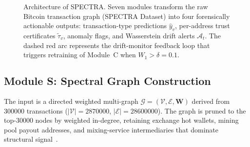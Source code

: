 \documentclass[journal]{IEEEtran}
\begin{document}
\begin{figure}[!t]
\caption{Architecture of \textsc{SPECTRA}. Seven modules transform the raw
  Bitcoin transaction graph (SPECTRA Dataset) into four forensically actionable
  outputs: transaction-type predictions $\hat{y}_v$, per-address trust
  certificates $\tilde{\tau}_v$, anomaly flags, and Wasserstein drift alerts
  $\mathcal{A}_t$.  The dashed red arc represents the drift-monitor feedback
  loop that triggers retraining of Module~C when $W_1 > \delta = 0.1$.}
\label{fig:architecture}
\end{figure}

\subsection{Module S: Spectral Graph Construction}
\label{sec:module_s}

The input is a directed weighted multi-graph
$\mathcal{G} = (\mathcal{V}, \mathcal{E}, \mathbf{W})$ derived from
\num{300000} transactions ($|\mathcal{V}| = \num{2870000}$,
$|\mathcal{E}| = \num{28600000}$).
The graph is pruned to the top-\num{30000} nodes by weighted in-degree,
retaining exchange hot wallets, mining pool payout addresses, and
mixing-service intermediaries that dominate structural signal~\cite{Li2023}.
\end{document}
